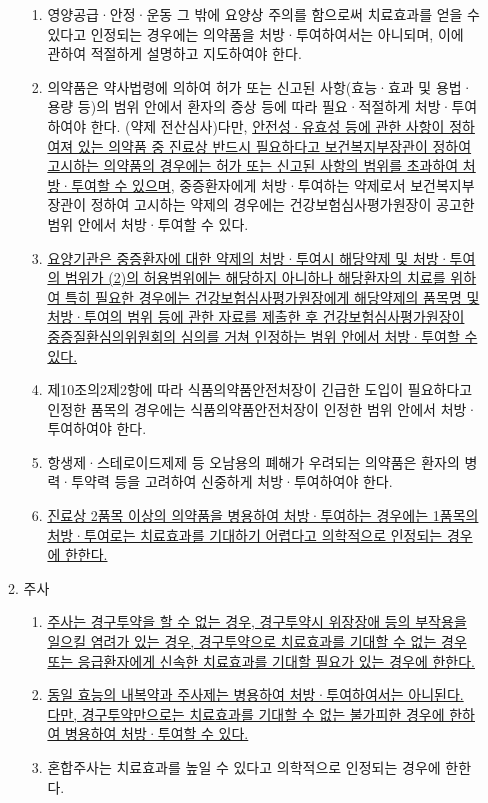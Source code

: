 \begin{enumerate}[1.]
\begin{enumerate}[가.]
		\begin{enumerate}[(1)]\tightlist
		\item 영양공급·안정·운동 그 밖에 요양상 주의를 함으로써 치료효과를 얻을 수 있다고 인정되는 경우에는 의약품을 처방·투여하여서는 아니되며, 이에 관하여 적절하게 설명하고 지도하여야 한다.
		\item 의약품은 약사법령에 의하여 \large{허가 또는 신고된 사항(효능·효과 및 용법·용량 등)의 범위 안에서 환자의 증상 등에 따라 필요·적절하게 처방·투여하여야 한다. (약제 전산심사)}다만, \uline{안전성·유효성 등에 관한 사항이 정하여져 있는 의약품 중 진료상 반드시 필요하다고 보건복지부장관이 정하여 고시하는 의약품의 경우에는 허가 또는 신고된 사항의 범위를 초과하여 처방·투여할 수 있으며}, 중증환자에게 처방·투여하는 약제로서 보건복지부장관이 정하여 고시하는 약제의 경우에는 건강보험심사평가원장이 공고한 범위 안에서 처방·투여할 수 있다.
		\item \uline{요양기관은 중증환자에 대한 약제의 처방·투여시 해당약제 및 처방·투여의 범위가 (2)의 허용범위에는 해당하지 아니하나 해당환자의 치료를 위하여 특히 필요한 경우에는 건강보험심사평가원장에게 해당약제의 품목명 및 처방·투여의 범위 등에 관한 자료를 제출한 후 건강보험심사평가원장이 중증질환심의위원회의 심의를 거쳐 인정하는 범위 안에서 처방·투여할 수 있다.}
		\item 제10조의2제2항에 따라 식품의약품안전처장이 긴급한 도입이 필요하다고 인정한 품목의 경우에는 식품의약품안전처장이 인정한 범위 안에서 처방·투여하여야 한다.
		\item 항생제·스테로이드제제 등 오남용의 폐해가 우려되는 의약품은 환자의 병력·투약력 등을 고려하여 신중하게 처방·투여하여야 한다.
		\item \uline{진료상 2품목 이상의 의약품을 병용하여 처방·투여하는 경우에는 1품목의 처방·투여로는 치료효과를 기대하기 어렵다고 의학적으로 인정되는 경우에 한한다.}
		\end{enumerate}  
	\item 주사
		\begin{enumerate}[(1)]\tightlist
		\item \uline{주사는 경구투약을 할 수 없는 경우, 경구투약시 위장장애 등의 부작용을 일으킬 염려가 있는 경우, 경구투약으로 치료효과를 기대할 수 없는 경우 또는 응급환자에게 신속한 치료효과를 기대할 필요가 있는 경우에 한한다.}
		\item \uline{동일 효능의 내복약과 주사제는 병용하여 처방·투여하여서는 아니된다. 다만, 경구투약만으로는 치료효과를 기대할 수 없는 불가피한 경우에 한하여 병용하여 처방·투여할 수 있다.}
		\item 혼합주사는 치료효과를 높일 수 있다고 의학적으로 인정되는 경우에 한한다. 

\end{enumerate}
\end{enumerate}
\end{enumerate}
